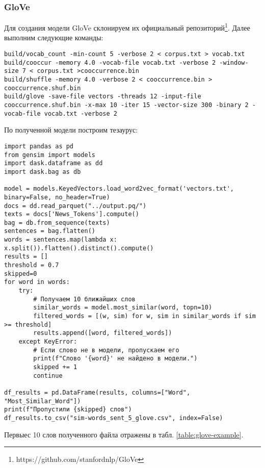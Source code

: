 \documentclass[coursework]{SCWorks}
\begin{document}
\subsubsection{GloVe}
Для создания модели GloVe склонируем их официальный репозиторий\footnote{https://github.com/stanfordnlp/GloVe}. Далее выполним следующие команды:
\begin{verbatim}
build/vocab_count -min-count 5 -verbose 2 < corpus.txt > vocab.txt
build/cooccur -memory 4.0 -vocab-file vocab.txt -verbose 2 -window-size 7 < corpus.txt >cooccurrence.bin
build/shuffle -memory 4.0 -verbose 2 < cooccurrence.bin > cooccurrence.shuf.bin
build/glove -save-file vectors -threads 12 -input-file cooccurrence.shuf.bin -x-max 10 -iter 15 -vector-size 300 -binary 2 -vocab-file vocab.txt -verbose 2
\end{verbatim}

По полученной модели построим тезаурус:
\begin{verbatim}
import pandas as pd
from gensim import models
import dask.dataframe as dd
import dask.bag as db

model = models.KeyedVectors.load_word2vec_format('vectors.txt', binary=False, no_header=True)
docs = dd.read_parquet("../output.pq/")
texts = docs['News_Tokens'].compute()
bag = db.from_sequence(texts)
sentences = bag.flatten()
words = sentences.map(lambda x: x.split()).flatten().distinct().compute()
results = []
threshold = 0.7
skipped=0
for word in words:
    try:
        # Получаем 10 ближайших слов
        similar_words = model.most_similar(word, topn=10)
        filtered_words = [(w, sim) for w, sim in similar_words if sim >= threshold]
        results.append([word, filtered_words])
    except KeyError:
        # Если слово не в модели, пропускаем его
        print(f"Слово '{word}' не найдено в модели.")
        skipped += 1
        continue

df_results = pd.DataFrame(results, columns=["Word", "Most_Similar_Word"])
print(f"Пропустили {skipped} слов")
df_results.to_csv("sim-words_sent_5_glove.csv", index=False)
\end{verbatim}

Первыес 10 слов полученного файла отражены в табл. \ref{table:glove-example}.
\end{document}
